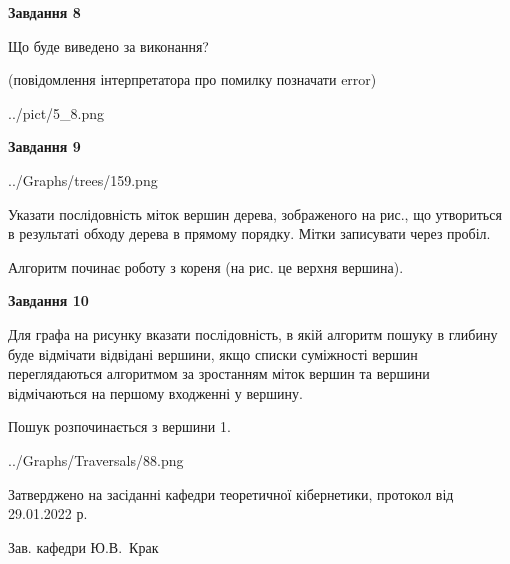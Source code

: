 \documentclass[12pt, ukrainian]{article}
\begin{document}
{\begin {large}
{\begin {center}\textbf{Завдання 8}\end {center}}\par
Що буде виведено за виконання?\par
 (повідомлення інтерпретатора про помилку позначати error)\par
\begin{center}
	{../pict/5_8.png}
\end{center}
\newpage

{\begin {center}\textbf{Завдання 9}\end {center}}\par

\begin{center}
	{../Graphs/trees/159.png}
\end{center}
Указати послідовність міток вершин дерева, зображеного на рис., що утвориться в результаті обходу дерева в прямому порядку. Мітки записувати через пробіл.\par Алгоритм починає роботу з кореня (на рис. це верхня вершина).\par
\newpage

{\begin {center}\textbf{Завдання 10}\end {center}}\par
Для графа на рисунку вказати послідовність, в якій алгоритм пошуку в глибину буде відмічати відвідані вершини, якщо списки суміжності вершин переглядаються алгоритмом за зростанням міток вершин та вершини відмічаються на першому вход\-женні у вершину.\par
Пошук розпочинається з вершини 1.\par

\begin{center}
	{../Graphs/Traversals/88.png}
\end{center}\par
\newpage


\end {large}
}
{\smallskip \begin {small} Затверджено на засіданні кафедри теоретичної кібернетики, протокол  від   29.01.2022 р.\par\smallskip\smallskip
{\parbox {6.5 cm}{Зав. кафедри \dotfill Ю.В.~Крак}} \end{small}}
\end{document}
